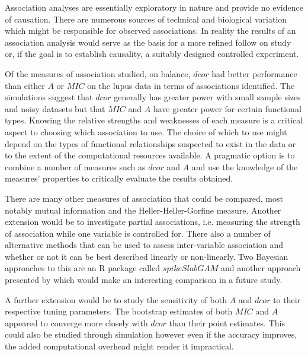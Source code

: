 \documentclass[a4paper, 12pt]{report}
\begin{document}
Association analyses are essentially exploratory in nature and provide no evidence of causation. There are numerous sources of technical and biological variation which might be responsible for observed associations. In reality the results of an association analysis would serve as the basis for a more refined follow on study or, if the goal is to establish causality, a suitably designed controlled experiment. 

Of the measures of association studied, on balance, $dcor$ had better performance than either $A$ or $MIC$ on the lupus data in terms of associations identified. The simulations suggest that $dcor$ generally has greater power with small sample sizes and noisy datasets but that $MIC$ and $A$ have greater power for certain functional types. Knowing the relative strengths and weaknesses of each measure is a critical aspect to choosing which association to use. The  choice of which to use might depend on the types of functional relationships suspected to exist in the data or to the extent of the computational resources available. A pragmatic option is to combine a number of measures such as $dcor$ and $A$ and use the knowledge of the measures' properties to critically evaluate the results obtained.

There are many other measures of association that could be compared, most notably mutual  information and the Heller-Heller-Gorfine \cite{HHG} measure. Another extension would be to investigate partial associations, i.e. measuring the strength of association while one variable is controlled for. There also a number of alternative methods that can be used to assess inter-variable association and whether or not it can be best described linearly or non-linearly. Two Bayesian approaches to this are an R package called $spikeSlabGAM$ \cite{spikeSlabGAM} and another approach presented by \citet{BayesianGRN} which would make an interesting comparison in a future study. 

 A further extension would be to study the sensitivity of both $A$ and $dcor$ to their respective tuning parameters. The bootstrap estimates of both $MIC$ and $A$ appeared to converge more closely with $dcor$ than their point estimates. This could also be studied through simulation however even if the accuracy improves, the added computational overhead might render it impractical.






\printglossary
\end{document}
